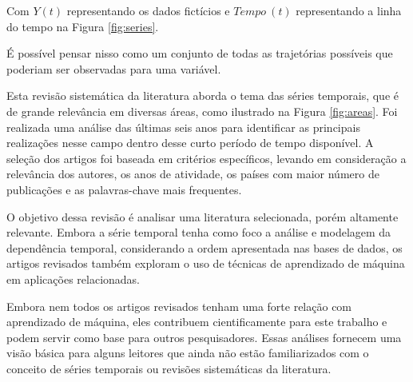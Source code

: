 

Com $Y(t)$ representando os dados fictícios e $Tempo \ (t)$ representando a linha do tempo na Figura \ref{fig:series}.

É possível pensar nisso como um conjunto de todas as trajetórias possíveis que poderiam ser observadas para uma variável.

Esta revisão sistemática da literatura aborda o tema das séries temporais, que é de grande relevância em diversas áreas, como ilustrado na Figura \ref{fig:areas}. Foi realizada uma análise das últimas seis anos para identificar as principais realizações nesse campo dentro desse curto período de tempo disponível. A seleção dos artigos foi baseada em critérios específicos, levando em consideração a relevância dos autores, os anos de atividade, os países com maior número de publicações e as palavras-chave mais frequentes.

O objetivo dessa revisão é analisar uma literatura selecionada, porém altamente relevante. Embora a série temporal tenha como foco a análise e modelagem da dependência temporal, considerando a ordem apresentada nas bases de dados, os artigos revisados também exploram o uso de técnicas de aprendizado de máquina em aplicações relacionadas. 

Embora nem todos os artigos revisados tenham uma forte relação com aprendizado de máquina, eles contribuem cientificamente para este trabalho e podem servir como base para outros pesquisadores. Essas análises fornecem uma visão básica para alguns leitores que ainda não estão familiarizados com o conceito de séries temporais ou revisões sistemáticas da literatura.
